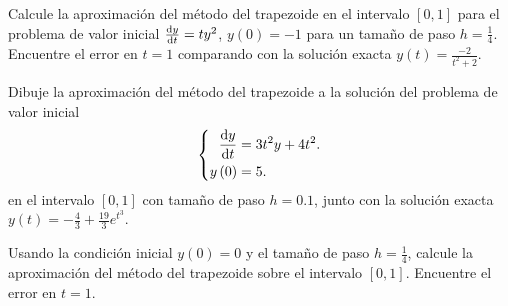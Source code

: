 \begin{questions}
    \question

    Calcule la aproximación del método del trapezoide en el intervalo
    $[0,1]$ para el problema de valor inicial $\diff{y}{t}=ty^{2}$,
    $y\left(0\right)=-1$ para un tamaño de paso $h=\frac{1}{4}$.
    Encuentre el error en $t=1$ comparando con la solución exacta
    \begin{math}
        y\left(t\right)=
        \frac{-2}{t^{2}+2}
    \end{math}.

    \question

    Dibuje la aproximación del método del trapezoide a la solución
    del problema de valor inicial
    \begin{equation*}
        \left\{
        \begin{aligned}
            \diff{y}{t}     & =
            3t^{2}y+4t^{2}.     \\
            y\left(0\right) & =
            5.
        \end{aligned}
        \right.
    \end{equation*}
    en el intervalo $\left[0,1\right]$ con tamaño de paso $h=0.1$,
    junto con la solución exacta
    \begin{math}
        y\left(t\right)=
        -\frac{4}{3}+
        \frac{19}{3}e^{t^{3}}
    \end{math}.

    \question

    Usando la condición inicial $y\left(0\right)=0$ y el tamaño de
    paso $h=\frac{1}{4}$, calcule la aproximación del método del
    trapezoide sobre el intervalo $\left[0,1\right]$.
    Encuentre el error en $t=1$.

    \begin{multicols}{3}
\end{multicols}
\end{questions}
